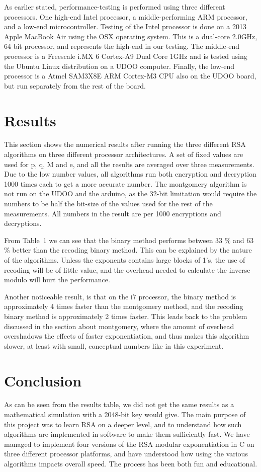 \documentclass[twocolumn]{IEEEtran}
\begin{document}
As earlier stated, performance-testing is performed using three different processors. One high-end Intel processor, a middle-performing ARM processor, and a low-end microcontroller. Testing of the Intel processor is done on a 2013 Apple MacBook Air using the OSX operating system. This is a dual-core 2.0GHz, 64 bit processor, and represents the high-end in our testing. The middle-end processor is a Freescale i.MX 6 Cortex-A9 Dual Core 1GHz and is tested using the Ubuntu Linux distribution on a UDOO computer. Finally, the low-end processor is a Atmel SAM3X8E ARM Cortex-M3 CPU also on the UDOO board, but run separately from the rest of the board.

\section{Results}
This section shows the numerical results after running the three different RSA algorithms on three different processor architectures. A set of fixed values are used for p, q, M and e, and all the results are averaged over three measurements. Due to the low number values, all algorithms run both encryption and decryption 1000 times each to get a more accurate number. The montgomery algorithm is not run on the UDOO and the arduino, as the 32-bit limitation would require the numbers to be half the bit-size of the values used for the rest of the measurements. All numbers in the result are per 1000 encryptions and decryptions.

From Table~1 we can see that the binary method performs between 33 \% and 63 \% better than the recoding binary method. This can be explained by the nature of the algorithms. Unless the exponents contains large blocks of 1’s, the use of recoding will be of little value, and the overhead needed to calculate the inverse modulo will hurt the performance.

Another noticeable result, is that on the i7 processor, the binary method is approximately 4 times faster than the montgomery method, and the recoding binary method is approximately 2 times faster. This leads back to the problem discussed in the section about montgomery, where the amount of overhead overshadows the effects of faster exponentiation, and thus makes this algorithm slower, at least with small, conceptual numbers like in this experiment.

\section{Conclusion}
As can be seen from the results table, we did not get the same results as a mathematical simulation with a 2048-bit key would give. The main purpose of this project was to learn RSA on a deeper level, and to understand how such algorithms are implemented in software to make them sufficiently fast.  We have managed to implement four versions of the RSA modular exponentiation in C on three different processor platforms, and have understood how using the various algorithms impacts overall speed. The process has been both fun and educational.



\end{document}
